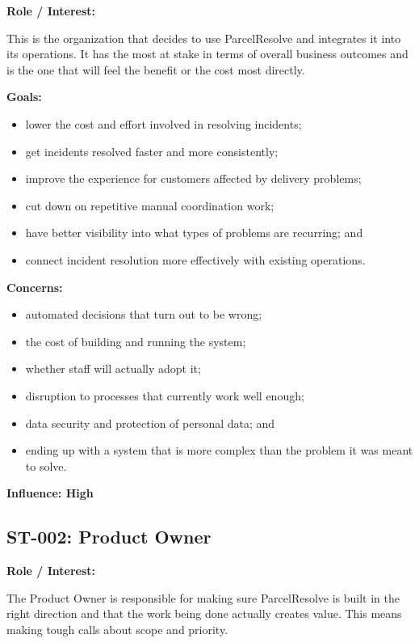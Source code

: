 \documentclass[11pt,a4paper]{article}
\begin{document}
\textbf{Role / Interest:}

This is the organization that decides to use ParcelResolve and
integrates it into its operations. It has the most at stake in
terms of overall business outcomes and is the one that will feel
the benefit or the cost most directly.

\textbf{Goals:}

\begin{itemize}
    \item lower the cost and effort involved in resolving incidents;
    \item get incidents resolved faster and more consistently;
    \item improve the experience for customers affected by delivery
    problems;
    \item cut down on repetitive manual coordination work;
    \item have better visibility into what types of problems are
    recurring; and
    \item connect incident resolution more effectively with existing
    operations.
\end{itemize}

\textbf{Concerns:}

\begin{itemize}
    \item automated decisions that turn out to be wrong;
    \item the cost of building and running the system;
    \item whether staff will actually adopt it;
    \item disruption to processes that currently work well enough;
    \item data security and protection of personal data; and
    \item ending up with a system that is more complex than the
    problem it was meant to solve.
\end{itemize}

\textbf{Influence: High}


\subsection{ST-002: Product Owner}

\textbf{Role / Interest:}

The Product Owner is responsible for making sure ParcelResolve is
built in the right direction and that the work being done actually
creates value. This means making tough calls about scope and priority.
\end{document}
